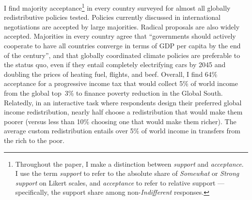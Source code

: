 \documentclass[12pt,english]{article}
\begin{document}
\begin{bibunit}
I find majority acceptance\footnote{Throughout the paper, I make a distinction between \textit{support} and \textit{acceptance}. I use the term \textit{support} to refer to the absolute share of \textit{Somewhat} or \textit{Strong support} on Likert scales, and \textit{acceptance} to refer to relative support ---specifically, the support share among non-\textit{Indifferent} responses.} in every country surveyed for almost all globally redistributive policies tested. Policies currently discussed in international negotiations are accepted by large majorities. %
Radical proposals are also widely accepted. Majorities in every country agree that ``governments should actively cooperate to have all countries converge in terms of GDP per capita by the end of the century'', and that globally coordinated climate policies are preferable to the status quo, even if they entail completely electrifying cars by 2045 and doubling the prices of heating fuel, flights, and beef. Overall, I find 64\% acceptance for a progressive income tax that would collect 5\% of world income from the global top~3\% to finance poverty reduction in the Global South. %
Relatedly, in an interactive task where respondents design their preferred global income redistribution, nearly half choose a redistribution that would make them poorer (versus less than 10\% choosing one that would make them richer). The average custom redistribution entails over 5\% of world income in transfers from the rich to the poor. 



\end{bibunit}
\end{document}
